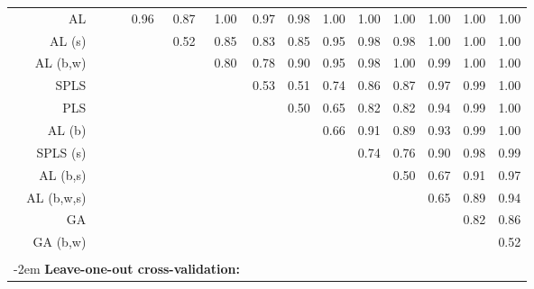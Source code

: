 \begin{table}[h!]
{\begin{tabular}{rccccccccccccc}
  AL &  &  & 0.96 & 0.87 & 1.00 & 0.97 & 0.98 & 1.00 & 1.00 & 1.00 & 1.00 & 1.00 & 1.00 \\ 
  AL (s) &  &  &  & 0.52 & 0.85 & 0.83 & 0.85 & 0.95 & 0.98 & 0.98 & 1.00 & 1.00 & 1.00 \\ 
  AL (b,w) &  &  &  &  & 0.80 & 0.78 & 0.90 & 0.95 & 0.98 & 1.00 & 0.99 & 1.00 & 1.00 \\ 
  SPLS &  &  &  &  &  & 0.53 & 0.51 & 0.74 & 0.86 & 0.87 & 0.97 & 0.99 & 1.00 \\ 
  PLS &  &  &  &  &  &  & 0.50 & 0.65 & 0.82 & 0.82 & 0.94 & 0.99 & 1.00 \\ 
  AL (b) &  &  &  &  &  &  &  & 0.66 & 0.91 & 0.89 & 0.93 & 0.99 & 1.00 \\ 
  SPLS (s) &  &  &  &  &  &  &  &  & 0.74 & 0.76 & 0.90 & 0.98 & 0.99 \\ 
  AL (b,s) &  &  &  &  &  &  &  &  &  & 0.50 & 0.67 & 0.91 & 0.97 \\ 
  AL (b,w,s) &  &  &  &  &  &  &  &  &  &  & 0.65 & 0.89 & 0.94 \\ 
  GA &  &  &  &  &  &  &  &  &  &  &  & 0.82 & 0.86 \\ 
  GA (b,w) &  &  &  &  &  &  &  &  &  &  &  &  & 0.52 \\ 
  & & & & & & & & & & & & & \\
\multicolumn{6}{l}{\kern-2em \textbf{Leave-one-out cross-validation:}} & & & & & & & & \\

\end{tabular}}
\end{table}
